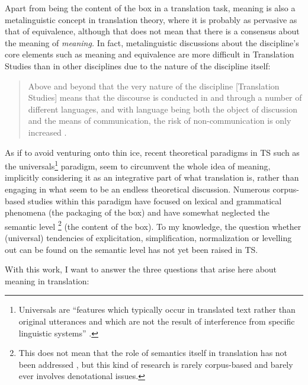 Apart from being the content of the box in a translation task, meaning is also a metalinguistic concept in translation theory, where it is probably as pervasive as that of equivalence, although that does not mean that there is a consensus about the meaning of \textit{meaning.} In fact, metalinguistic discussions about the discipline’s core elements such as meaning and equivalence are more difficult in Translation Studies than in other disciplines due to the nature of the discipline itself: 

\begin{quote}
Above and beyond that the very nature of the discipline [Translation Studies] means that the discourse is conducted in and through a number of different languages, and with language being both the object of discussion and the means of communication, the risk of non-communication is only increased \citep[314]{snell-hornby_whats_2007}.
\end{quote}

As if to avoid venturing onto thin ice, recent theoretical paradigms in TS such as the universals\footnote{Universals are “features which typically occur in translated text rather than original utterances and which are not the result of interference from specific linguistic systems” \citep[243]{baker_corpus_1993}.} paradigm, seem to circumvent the whole idea of meaning, implicitly considering it as an integrative part of what translation is, rather than engaging in what seem to be an endless theoretical discussion. Numerous corpus-based studies within this paradigm \citep{poyatos_punctuation_1997,laviosa_core_1998, laviosa_corpus-based_2002,olohan_strange_2000,olohan_reporting_2000,baker_corpus-based_2004,bernardini_practice_2011,delaere_is_2012,oakes_lexical_2012,Kruger2012} have focused on lexical and grammatical phenomena (the packaging of the box) and have somewhat neglected the semantic level \citep[28]{laviosa_corpus-based_2002}\footnote{This does not mean that the role of semantics itself in translation has not been addressed \citep{lewandowska-tomasczyk_specification_2010}, but this kind of research is rarely corpus-based and barely ever involves denotational issues.} (the content of the box). To my knowledge, the question whether (universal) tendencies of explicitation, simplification, normalization or levelling out can be found on the semantic level has not yet been raised in TS.

With this work, I want to answer the three questions that arise here about meaning in translation:


